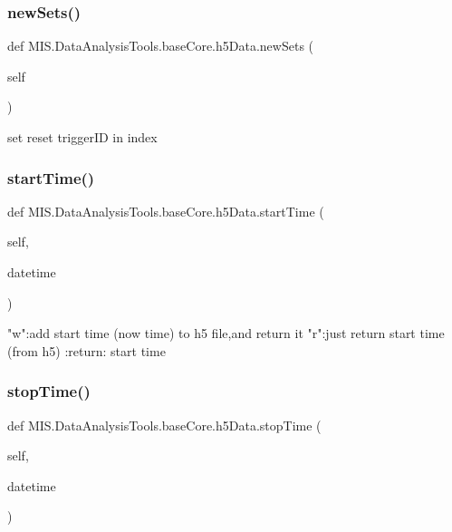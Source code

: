 \subsubsection{\texorpdfstring{new\+Sets()}{newSets()}}
{\footnotesize\ttfamily def M\+I\+S.\+Data\+Analysis\+Tools.\+base\+Core.\+h5\+Data.\+new\+Sets (\begin{DoxyParamCaption}\item[{}]{self }\end{DoxyParamCaption})}

\begin{DoxyVerb}set reset triggerID in index
\end{DoxyVerb}
 \mbox{\label{classMIS_1_1DataAnalysisTools_1_1baseCore_1_1h5Data_a222ea2979ca5399573d6966aebfbb02b}} 
\subsubsection{\texorpdfstring{start\+Time()}{startTime()}}
{\footnotesize\ttfamily def M\+I\+S.\+Data\+Analysis\+Tools.\+base\+Core.\+h5\+Data.\+start\+Time (\begin{DoxyParamCaption}\item[{}]{self,  }\item[{}]{datetime }\end{DoxyParamCaption})}

\begin{DoxyVerb}"w":add start time (now time) to h5 file,and return it
"r":just return start time (from h5)
:return: start time
\end{DoxyVerb}
 \mbox{\label{classMIS_1_1DataAnalysisTools_1_1baseCore_1_1h5Data_a26f398277e292174581c01eb1ad64d3c}} 
\subsubsection{\texorpdfstring{stop\+Time()}{stopTime()}}
{\footnotesize\ttfamily def M\+I\+S.\+Data\+Analysis\+Tools.\+base\+Core.\+h5\+Data.\+stop\+Time (\begin{DoxyParamCaption}\item[{}]{self,  }\item[{}]{datetime }\end{DoxyParamCaption})}

